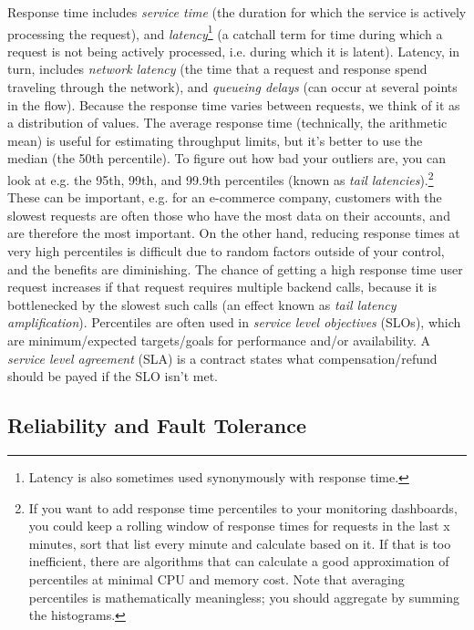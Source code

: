 \documentclass[table, xcdraw]{article}%
\begin{document}
Response time includes \textit{service time} (the duration for which the service is actively processing the request), and \textit{latency}\footnote{Latency is also sometimes used synonymously with response time.} (a catchall term for time during which a request is not being actively processed, i.e. during which it is latent). Latency, in turn, includes \textit{network latency} (the time that a request and response spend traveling through the network), and \textit{queueing delays} (can occur at several points in the flow). Because the response time varies between requests, we think of it as a distribution of values. The average response time (technically, the arithmetic mean) is useful for estimating throughput limits, but it’s better to use the median (the 50th percentile). To figure out how bad your outliers are, you can look at e.g. the 95th, 99th, and 99.9th percentiles (known as \textit{tail latencies}).\footnote{If you want to add response time percentiles to your monitoring dashboards, you could keep a rolling window of response times for requests in the last x minutes, sort that list every minute and calculate based on it. If that is too inefficient, there are algorithms that can calculate a good approximation of percentiles at minimal CPU and memory cost. Note that averaging percentiles is mathematically meaningless; you should aggregate by summing the histograms.} These can be important, e.g. for an e-commerce company, customers with the slowest requests are often those who have the most data on their accounts, and are therefore the most important. On the other hand, reducing response times at very high percentiles is difficult due to random factors outside of your control, and the benefits are diminishing. The chance of getting a high response time user request increases if that request requires multiple backend calls, because it is bottlenecked by the slowest such calls (an effect known as \textit{tail latency amplification}). Percentiles are often used in \textit{service level objectives} (SLOs), which are minimum/expected targets/goals for performance and/or availability. A \textit{service level agreement} (SLA) is a contract states what compensation/refund should be payed if the SLO isn't met.

\subsection{Reliability and Fault Tolerance}
\end{document}
